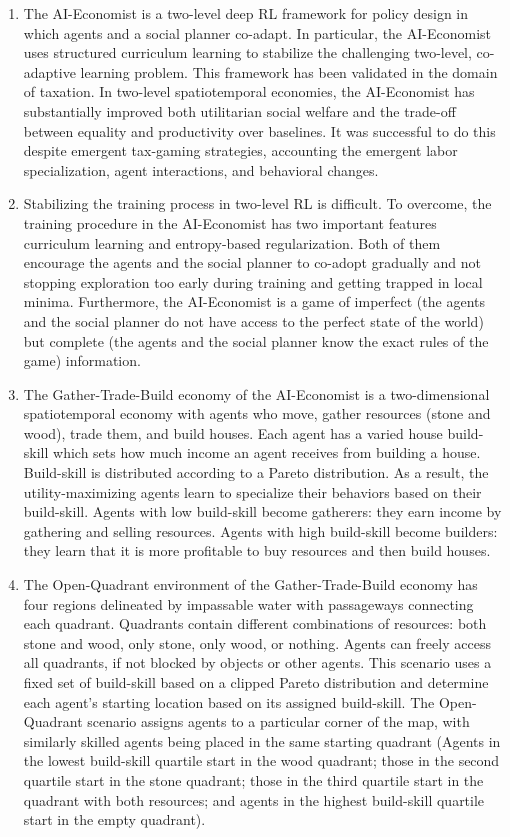 \documentclass{article}
\begin{document}
\begin{enumerate}
	\item The AI-Economist is a two-level deep RL framework for policy design in which agents and a social planner co-adapt. In particular, the AI-Economist uses structured curriculum learning to stabilize the challenging two-level, co-adaptive learning problem. This framework has been validated in the domain of taxation. In two-level spatiotemporal economies, the AI-Economist has substantially improved both utilitarian social welfare and the trade-off between equality and productivity over baselines. It was successful to do this despite emergent tax-gaming strategies, accounting the emergent labor specialization, agent interactions, and behavioral changes.
	
	\item Stabilizing the training process in two-level RL is difficult. To overcome, the training procedure in the AI-Economist has two important features \textendash curriculum learning and entropy-based regularization. Both of them encourage the agents and the social planner to co-adopt gradually and not stopping exploration too early during training and getting trapped in local minima. Furthermore, the AI-Economist is a game of imperfect (the agents and the social planner do not have access to the perfect state of the world) but complete (the agents and the social planner know the exact rules of the game) information.
	
	\item The Gather-Trade-Build economy of the AI-Economist is a two-dimensional spatiotemporal economy with agents who move, gather resources (stone and wood), trade them, and build houses. Each agent has a varied house build-skill which sets how much income an agent receives from building a house. Build-skill is distributed according to a Pareto distribution. As a result, the utility-maximizing agents learn to specialize their behaviors based on their build-skill. Agents with low build-skill become gatherers: they earn income by gathering and selling resources. Agents with high build-skill become builders: they learn that it is more profitable to buy resources and then build houses.
	
	\item The Open-Quadrant environment of the Gather-Trade-Build economy has four regions delineated by impassable water with passageways connecting each quadrant. Quadrants contain different combinations of resources: both stone and wood, only stone, only wood, or nothing. Agents can freely access all quadrants, if not blocked by objects or other agents. This scenario uses a fixed set of build-skill based on a clipped Pareto distribution and determine each agent’s starting location based on its assigned build-skill. The Open-Quadrant scenario assigns agents to a particular corner of the map, with similarly skilled agents being placed in the same starting quadrant (Agents in the lowest build-skill quartile start in the wood quadrant; those in the second quartile start in the stone quadrant; those in the third quartile start in the quadrant with both resources; and agents in the highest build-skill quartile start in the empty quadrant).
	

\end{enumerate}
\end{document}
